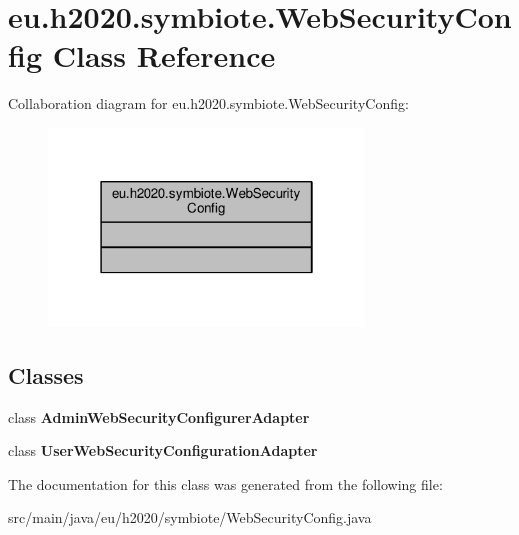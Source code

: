 \hypertarget{classeu_1_1h2020_1_1symbiote_1_1WebSecurityConfig}{}\section{eu.\+h2020.\+symbiote.\+Web\+Security\+Config Class Reference}
\label{classeu_1_1h2020_1_1symbiote_1_1WebSecurityConfig}


Collaboration diagram for eu.\+h2020.\+symbiote.\+Web\+Security\+Config\+:
\nopagebreak
\begin{figure}[H]
\begin{center}
\leavevmode
\includegraphics[width=238pt]{classeu_1_1h2020_1_1symbiote_1_1WebSecurityConfig__coll__graph}
\end{center}
\end{figure}
\subsection*{Classes}
\begin{DoxyCompactItemize}
\item 
class {\bfseries Admin\+Web\+Security\+Configurer\+Adapter}
\item 
class {\bfseries User\+Web\+Security\+Configuration\+Adapter}
\end{DoxyCompactItemize}


The documentation for this class was generated from the following file\+:\begin{DoxyCompactItemize}
\item 
src/main/java/eu/h2020/symbiote/Web\+Security\+Config.\+java\end{DoxyCompactItemize}
